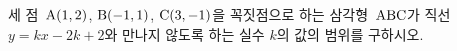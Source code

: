 세 점~$\mathrm{A}(1{,}\mkern3mu\mathopen{}2)$, $\mathrm{B}(-1{,}\mkern3mu\mathopen{}1)$, $\mathrm{C}(3{,}\mkern3mu\mathopen{}-1)$을 꼭짓점으로 하는 삼각형~$\mathrm{ABC}$가 직선~$y=kx-2k+2$와 만나지 않도록 하는 실수 $k$의 값의 범위를 구하시오.
